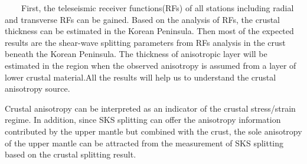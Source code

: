 \documentclass{article}
\begin{document}
~~~~First, the teleseismic receiver functions(RFs) of all stations including radial and transverse RFs can be gained. Based on the analysis of RFs, the crustal thickness can be estimated in the Korean Peninsula. Then  most of the expected results are the shear-wave splitting parameters from RFs analysis in the crust beneath the Korean Peninsula. The thickness of anisotropic layer will be estimated in the region when the observed anisotropy is assumed from a layer of lower crustal material.All the results will help us to understand the crustal anisotropy source. 
\newline

Crustal anisotropy can be interpreted as an indicator of the crustal stress/strain regime. In addition, since SKS splitting can offer  the anisotropy information contributed by the upper mantle but combined with the crust, the sole anisotropy of the upper mantle can be attracted from the measurement of SKS splitting based on the crustal splitting result. 
 
\end{document}
